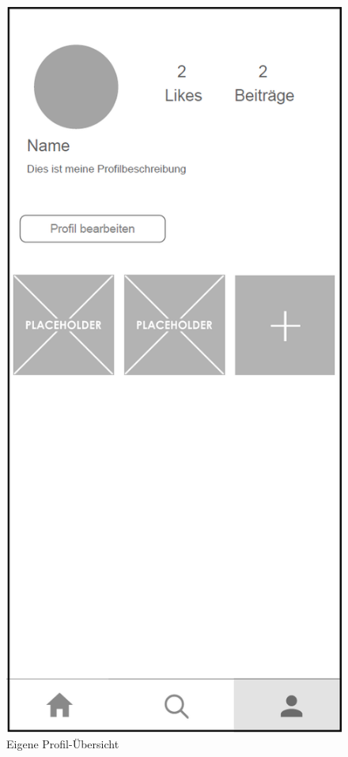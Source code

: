 \begin{figure}[H]
    \centering
    \begin{minipage}{.5\textwidth}
      \centering
      \includegraphics[width=.6\linewidth]{images/Profil_MockUp.png}
      \caption{Eigene Profil-Übersicht}
      \label{fig:own_profile}
    \end{minipage}%
    \begin{minipage}{.5\textwidth}
      \centering

\end{minipage}
\end{figure}
